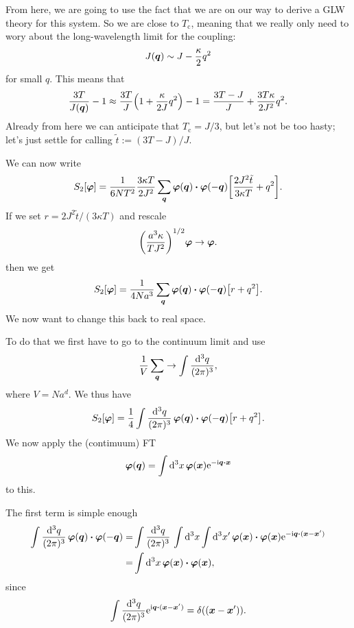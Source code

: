 \documentclass[11pt,letter, swedish, english
]{article}
\newcommand{\Tc}{\ensuremath{T_{\text{c}}}}
\begin{document}
From here, we are going to use the fact that we are on our way to
derive a GLW theory for this system. So we are close to $\Tc$,
meaning that we really only need to wory about the long-wavelength
limit for the coupling:
\begin{equation}
J(\vb*q)\sim J-\frac{\kappa}{2}q^2
\end{equation}
for small $q$. This means that
\begin{equation}
\frac{3T}{J(\vb*q)}-1\approx
\frac{3T}{J}\qty(1+\frac{\kappa}{2J}q^2)-1
=\frac{3T-J}{J}+\frac{3T\kappa}{2J^2}q^2.
\end{equation}
Already from here we can anticipate that $\Tc=J/3$, but let's not be
too hasty; let's just settle for calling $\tilde{t}:=(3T-J)/J$. 

We can now write
\begin{equation}
S_2[\vb*\varphi]=\frac{1}{6NT^2}\frac{3\kappa T}{2J^2}\sum_{\vb*q}
\vb*\varphi(\vb*q)\vdot\vb*\varphi(-\vb*q)
\qty[\frac{2J^2\tilde{t}}{3\kappa T}+q^2].
\end{equation}
If we set $r=2J^2\tilde{t}/(3\kappa T)$ and rescale
\begin{equation}\label{eq:3_rescale}
\qty(\frac{a^3\kappa}{TJ^2})^{1/2}\vb*\varphi\to\vb*\varphi.
\end{equation}
then we get
\begin{equation}
S_2[\vb*\varphi]=\frac{1}{4Na^3}\sum_{\vb*q}
\vb*\varphi(\vb*q)\vdot\vb*\varphi(-\vb*q)
\qty[r+q^2].
\end{equation}
We now want to change this back to real space.

To do that we first have to go to the continuum limit and use 
\begin{equation}
\frac{1}{V}\sum_{\vb*q} \to \int\frac{\rd^3q}{(2\pi)^3},
\end{equation}
where $V=Na^d$. We thus have
\begin{equation}\label{eq:3_S2_qint}
S_2[\vb*\varphi]=\frac{1}{4}\int\frac{\rd^3q}{(2\pi)^3}\,
\vb*\varphi(\vb*q)\vdot\vb*\varphi(-\vb*q)
\qty[r+q^2].
\end{equation}
We now apply the (contimuum) FT
\begin{equation}
\vb*\varphi(\vb*q)=\int\rd^3x\,
\vb*\varphi(\vb*x)\ee^{-\ii\vb*q\vdot\vb*x}
\end{equation}
to this.

The first term is simple enough
\begin{equation}
\begin{aligned}
\int\frac{\rd^3q}{(2\pi)^3}\,
\vb*\varphi(\vb*q)\vdot\vb*\varphi(-\vb*q)
=&\int\frac{\rd^3q}{(2\pi)^3}\,
\int\rd^3x\int\rd^3x'\,
\vb*\varphi(\vb*x)\vdot\vb*\varphi(\vb*x)
\ee^{-\ii\vb*q\vdot(\vb*x-\vb*x')}\\
=&\int\rd^3x\,\vb*\varphi(\vb*x)\vdot\vb*\varphi(\vb*x),
\end{aligned}
\end{equation}
since
\begin{equation}
\int\frac{\rd^3q}{(2\pi)^3}\ee^{\ii\vb*q\vdot(\vb*x-\vb*x')}
=\delta((\vb*x-\vb*x')).
\end{equation}
\end{document}
